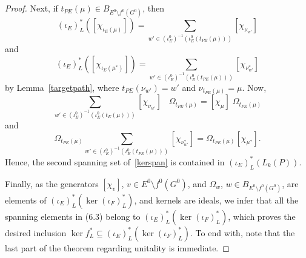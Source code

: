 \documentclass[12pt,times,a4paper]{amsart}
\numberwithin{equation}{section}
\numberwithin{equation}{section}
\begin{document}
\begin{proof}
Next, if $t_{PE}(\mu)\in B_{E^0\setminus f^0(G^0)}$, then
\begin{equation}
(\iota_E)^*_L([\chi_{\iota_E(\mu)}])=\!\!\!\!\!\!\sum_{w'\in(\iota_E^0)^{-1}(\iota_E^0(t_{PE}(\mu)))}\!\!\!\!\!\![\chi_{\nu_{w'}}]
\end{equation}
and
\begin{equation}
(\iota_E)^*_L([\chi_{\iota_E(\mu^*)}])=\!\!\!\!\!\!\sum_{w'\in(\iota_E^0)^{-1}(\iota_E^0(t_{PE}(\mu)))}\!\!\!\!\!\![\chi_{\nu_{w'}^*}]
\end{equation}
by Lemma~\ref{targetpath}, where $t_{PE}(\nu_{w'})=w'$ and $\nu_{t_{PE}(\mu)}=\mu$. Now,
\begin{equation}
\sum_{w'\in (\iota_E^0)^{-1}(\iota_E^0(t_E(\mu)))}\!\!\!\!\!\!\!\!\!\!\!\!\!\![\chi_{\nu_{w'}}]\;\;\;\Omega_{t_{PE}(\mu)}=[\chi_\mu]\;\Omega_{t_{PE}(\mu)}
\end{equation}
and 
\begin{equation}
\Omega_{t_{PE}(\mu)}\sum_{w'\in (\iota_E^0)^{-1}(\iota_E^0(t_{PE}(\mu)))}\!\!\!\!\!\!\!\!\!\!\!\!\![\chi_{\nu^*_{w'}}]=\Omega_{t_{PE}(\mu)}[\chi_{\mu^*}].
\end{equation}
Hence, the second spanning set of~\eqref{kerspan} is contained in $(\iota_E)^*_L(L_k(P))$. 

Finally, as the generators $[\chi_v]$, $v\in E^0\setminus f^0(G^0)$, and $\Omega_w$, $w\in B_{E^0\setminus f^0(G^0)}$, are elements of 
$(\iota_E)^*_L(\ker(\iota_F)^*_L)$, and kernels are ideals, we infer that all the spanning elements in (6.3) belong to $(\iota_E)^*_L(\ker(\iota_F)^*_L)$, 
which proves the desired inclusion $\ker f^*_L\subseteq (\iota_E)^*_L(\ker(\iota_F)^*_L)$. To end with, note that the last part of the theorem regarding 
unitality is immediate.
\end{proof}
\end{document}
